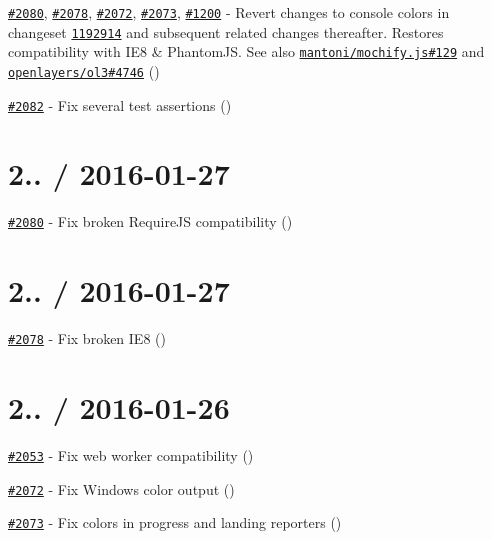 \begin{DoxyItemize}
\item \href{https://github.com/mochajs/mocha/issues/2080}{\tt \#2080}, \href{https://github.com/mochajs/mocha/issues/2078}{\tt \#2078}, \href{https://github.com/mochajs/mocha/pull/2072}{\tt \#2072}, \href{https://github.com/mochajs/mocha/pull/2073}{\tt \#2073}, \href{https://github.com/mochajs/mocha/issues/1200}{\tt \#1200} -\/ Revert changes to console colors in changeset \href{https://github.com/mochajs/mocha/commit/119291449cd03a11cdeda9e37cf718a69a012896}{\tt 1192914} and subsequent related changes thereafter. Restores compatibility with I\+E8 \& Phantom\+JS. See also \href{https://github.com/mantoni/mochify.js/issues/129}{\tt mantoni/mochify.\+js\#129} and \href{https://github.com/openlayers/ol3/pull/4746}{\tt openlayers/ol3\#4746} (\href{https://github.com/boneskull}{\tt })
\item \href{https://github.com/mochajs/mocha/pull/2082}{\tt \#2082} -\/ Fix several test assertions (\href{https://github.com/mislav}{\tt })
\end{DoxyItemize}

\section*{2.. / 2016-\/01-\/27}


\begin{DoxyItemize}
\item \href{https://github.com/mochajs/mocha/issues/2080}{\tt \#2080} -\/ Fix broken Require\+JS compatibility (\href{https://github.com/boneskull}{\tt })
\end{DoxyItemize}

\section*{2.. / 2016-\/01-\/27}


\begin{DoxyItemize}
\item \href{https://github.com/mochajs/mocha/issues/2078}{\tt \#2078} -\/ Fix broken I\+E8 (\href{https://github.com/boneskull}{\tt })
\end{DoxyItemize}

\section*{2.. / 2016-\/01-\/26}


\begin{DoxyItemize}
\item \href{https://github.com/mochajs/mocha/pull/2053}{\tt \#2053} -\/ Fix web worker compatibility (\href{https://github.com/mislav}{\tt })
\item \href{https://github.com/mochajs/mocha/pull/2072}{\tt \#2072} -\/ Fix Windows color output (\href{https://github.com/thedark1337}{\tt })
\item \href{https://github.com/mochajs/mocha/pull/2073}{\tt \#2073} -\/ Fix colors in {\ttfamily progress} and {\ttfamily landing} reporters (\href{https://github.com/gyandeeps}{\tt })
\end{DoxyItemize}

